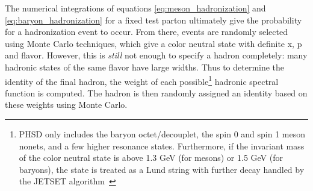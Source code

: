 The numerical integrations of equations \ref{eq:meson_hadronization} and \ref{eq:baryon_hadronization} for a fixed test parton ultimately give the probability for a hadronization event to occur. From there, events are randomly selected using Monte Carlo techniques, which give a color neutral state with definite x, p and flavor. However, this is \textit{still} not enough to specify a hadron completely: many hadronic states of the same flavor have large widths. Thus to determine the identity of the final hadron, the weight of each possible\footnote{PHSD only includes the baryon octet/decouplet, the spin 0 and spin 1 meson nonets, and a few higher resonance states. Furthermore, if the invariant mass of the color neutral state is above 1.3 GeV (for mesons) or 1.5 GeV (for baryons), the state is treated as a Lund string with further decay handled by the JETSET algorithm~\cite{JETSET}} hadronic spectral function is computed. The hadron is then randomly assigned an identity based on these weights using Monte Carlo.

